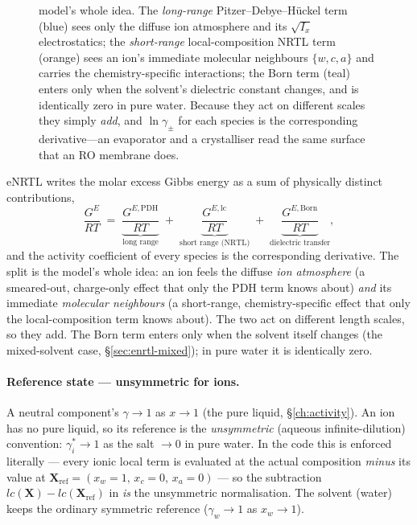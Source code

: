 \documentclass[11pt,a4paper]{article}
\begin{document}
\begin{figure}[ht]
{model's whole idea.  The \emph{long-range} Pitzer--Debye--H\"uckel term
(blue) sees only the diffuse ion atmosphere and its $\sqrt{I_x}$
electrostatics; the \emph{short-range} local-composition NRTL term
(orange) sees an ion's immediate molecular neighbours
$\{w,c,a\}$ and carries the chemistry-specific interactions; the Born term
(teal) enters only when the solvent's dielectric constant changes, and is
identically zero in pure water.  Because they act on different scales they
simply \emph{add}, and $\ln\gamma_\pm$ for each species is the
corresponding derivative---an evaporator and a crystalliser read the same
surface that an RO membrane does.}
\label{fig:enrtl-layers}
\end{figure}


eNRTL writes the molar excess Gibbs energy as a sum of physically
distinct contributions,
\begin{equation}
   \frac{G^{E}}{RT}
   \;=\;
   \underbrace{\frac{G^{E,\mathrm{PDH}}}{RT}}_{\text{long range}}
   \;+\;
   \underbrace{\frac{G^{E,\mathrm{lc}}}{RT}}_{\text{short range (NRTL)}}
   \;+\;
   \underbrace{\frac{G^{E,\mathrm{Born}}}{RT}}_{\text{dielectric transfer}},
   \label{eq:enrtl-gibbs}
\end{equation}
and the activity coefficient of every species is the corresponding
derivative.  The split is the model's whole idea: an ion feels the
diffuse \emph{ion atmosphere} (a smeared-out, charge-only effect that
only the PDH term knows about) \emph{and} its immediate \emph{molecular
neighbours} (a short-range, chemistry-specific effect that only the
local-composition term knows about).  The two act on different length
scales, so they add.  The Born term enters only when the solvent itself
changes (the mixed-solvent case, \S\ref{sec:enrtl-mixed}); in pure water
it is identically zero.

\paragraph{Reference state --- unsymmetric for ions.}
A neutral component's $\gamma\!\to\!1$ as $x\!\to\!1$ (the pure liquid,
\S\ref{ch:activity}).  An ion has no pure liquid, so its reference is
the \emph{unsymmetric} (aqueous infinite-dilution) convention:
$\gamma_i^{*}\!\to\!1$ as the salt $\to 0$ in pure water.  In the code
this is enforced literally --- every ionic local term is evaluated at
the actual composition \emph{minus} its value at $\mathbf{X}_{\text{ref}} =
(x_w{=}1,\,x_c{=}0,\,x_a{=}0)$ --- so the subtraction $lc(\mathbf X) -
lc(\mathbf X_{\text{ref}})$ in  \emph{is} the
unsymmetric normalisation.  The solvent (water) keeps the ordinary
symmetric reference ($\gamma_w\!\to\!1$ as $x_w\!\to\!1$).
\end{document}
